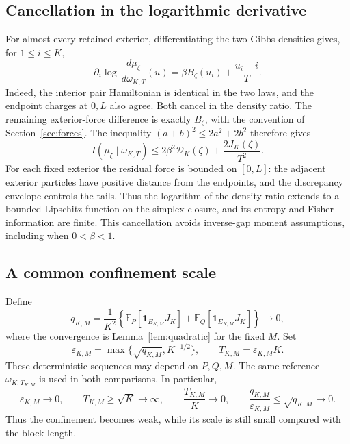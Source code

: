\documentclass[11pt,reqno]{amsart}
\numberwithin{equation}{section}
\theoremstyle{definition}
\theoremstyle{remark}
\newcommand{\E}{\mathbb E}
\newcommand{\1}{\mathbf 1}
\newcommand{\dd}{\,d}
\begin{document}
\subsection{Cancellation in the logarithmic derivative}

For almost every retained exterior, differentiating the two Gibbs
densities gives, for $1\le i\le K$,
\begin{equation}\label{eq:score-identity}
\partial_i\log\frac{\dd\mu_\zeta}{\dd\omega_{K,T}}(u)
=\beta B_\zeta(u_i)+\frac{u_i-i}{T}.
\end{equation}
Indeed, the interior pair Hamiltonian is identical in the two laws,
and the endpoint charges at $0,L$ also agree. Both cancel in the
density ratio. The remaining exterior-force difference is exactly
$B_\zeta$, with the convention of Section~\ref{sec:forces}.
The inequality $(a+b)^2\le2a^2+2b^2$ therefore gives
\begin{equation}\label{eq:score}
I(\mu_\zeta\mid\omega_{K,T})
\le 2\beta^2\mathcal D_K(\zeta)+\frac{2J_K(\zeta)}{T^2}.
\end{equation}
For each fixed exterior the residual force is bounded on $[0,L]$:
the adjacent exterior particles have positive distance from the
endpoints, and the discrepancy envelope controls the tails.
Thus the logarithm of the density ratio extends to a bounded Lipschitz
function on the simplex closure, and its entropy and Fisher information
are finite. This cancellation avoids inverse-gap moment assumptions,
including when $0<\beta<1$.

\subsection{A common confinement scale}

Define
\[
q_{K,M}=\frac1{K^2}\left\{
\E_P[\1_{E_{K,M}}J_K]+\E_Q[\1_{E_{K,M}}J_K]\right\}\longrightarrow0,
\]
where the convergence is Lemma~\ref{lem:quadratic} for the fixed $M$.
Set
\begin{equation}\label{eq:choice}
\varepsilon_{K,M}=\max\{\sqrt{q_{K,M}},K^{-1/2}\},
\qquad T_{K,M}=\varepsilon_{K,M}K.
\end{equation}
These deterministic sequences may depend on $P,Q,M$. The same
reference $\omega_{K,T_{K,M}}$ is used in both comparisons. In
particular,
\begin{equation}\label{eq:scale-consequences}
\varepsilon_{K,M}\to0,\qquad
T_{K,M}\ge\sqrt K\to\infty,\qquad
\frac{T_{K,M}}K\to0,\qquad
\frac{q_{K,M}}{\varepsilon_{K,M}}
\le\sqrt{q_{K,M}}\to0.
\end{equation}
Thus the confinement becomes weak, while its scale is still small
compared with the block length.
\end{document}
